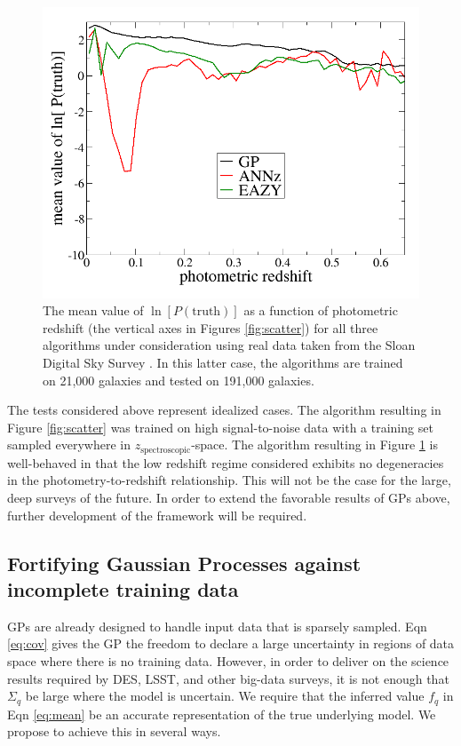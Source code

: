 \documentclass[prd,nofootbib,floatfix,11pt,tightenlines,nofootinbib]{revtex4}
\begin{document}
\begin{figure}[t]
\centerline{\includegraphics[scale=0.3]{sdss_lnsum.png}}
\caption{
The mean value of
$\ln[P(\text{truth})]$ as a function of photometric redshift (the vertical
axes in Figures \ref{fig:scatter}) for all
three algorithms under consideration using real
data taken from the Sloan Digital Sky Survey \cite{Abazajian:2008wr}.  
In this latter case, the
algorithms are trained on 21,000 galaxies and tested on 191,000 galaxies.
}
\label{fig:lnsum}
\end{figure}

The tests considered above represent idealized cases.
The algorithm resulting in Figure \ref{fig:scatter} was trained on high
signal-to-noise data with a training set sampled everywhere in
$z_\text{spectroscopic}$-space.  The algorithm resulting in Figure
\ref{fig:lnsum} is well-behaved in that the low redshift regime considered
exhibits no degeneracies in the photometry-to-redshift relationship.  This will
not be the case for the large, deep surveys of the future.  In order to extend
the favorable results of GPs above, further development of the
framework will be required.

\subsection{Fortifying Gaussian Processes against incomplete training data}
\label{sec:sparse}


GPs are already designed to handle input data that is sparsely
sampled.  Eqn \ref{eq:cov} gives the GP the freedom to declare a large
uncertainty in regions of data space where there is no training data.  However,
in order to deliver on the science results required by DES, LSST, and other
big-data surveys, it is not enough that $\Sigma_q$ be large where the model is
uncertain.  We require that the inferred 
value $f_q$ in Eqn \ref{eq:mean} be an accurate
representation of the true underlying model.  
We propose to achieve this in several ways.
\end{document}
